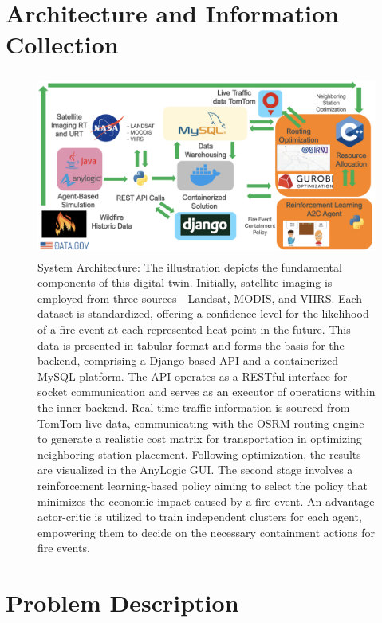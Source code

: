 \documentclass[lettersize,journal]{IEEEtran}
\begin{document}
\section{Architecture and Information Collection}\label{Architecture and Information Collection}
  

\begin{figure}
  \centering
  \includegraphics[height=6cm,width=12cm]{figs/Arch.png}
  \caption{
    System Architecture: The illustration depicts the fundamental components of this digital twin. Initially, satellite imaging is employed from three sources—Landsat, MODIS, and VIIRS. Each dataset is standardized, offering a confidence level for the likelihood of a fire event at each represented heat point in the future. This data is presented in tabular format and forms the basis for the backend, comprising a Django-based API and a containerized MySQL platform. The API operates as a RESTful interface for socket communication and serves as an executor of operations within the inner backend. Real-time traffic information is sourced from TomTom live data, communicating with the OSRM routing engine to generate a realistic cost matrix for transportation in optimizing neighboring station placement. Following optimization, the results are visualized in the AnyLogic GUI. The second stage involves a reinforcement learning-based policy aiming to select the policy that minimizes the economic impact caused by a fire event. An advantage actor-critic is utilized to train independent clusters for each agent, empowering them to decide on the necessary containment actions for fire events. }\label{fig:arch}
  
\end{figure}

\section{Problem Description}\label{Problem Description}
\end{document}
